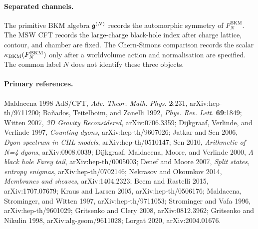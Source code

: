\paragraph{Separated channels.}
The primitive BKM algebra \(\mathfrak{g}^{(N)}\) records the automorphic
symmetry of \(F_N^{\mathrm{BKM}}\). The MSW CFT records the
large-charge black-hole index after charge lattice, contour, and
chamber are fixed. The Chern-Simons comparison records the scalar
\(\kappa_{\mathrm{BKM}}(F_N^{\mathrm{BKM}})\) only after a worldvolume action and
normalisation are specified. The common label \(N\) does not identify
these three objects.

\paragraph{Primary references.}
Maldacena 1998 AdS/CFT, \emph{Adv. Theor. Math. Phys.} \textbf{2}:231,
arXiv:hep-th/9711200;
Ba\~nados, Teitelboim, and Zanelli 1992, \emph{Phys. Rev. Lett.}
\textbf{69}:1849;
Witten 2007, \emph{3D Gravity Reconsidered}, arXiv:0706.3359;
Dijkgraaf, Verlinde, and Verlinde 1997, \emph{Counting dyons},
arXiv:hep-th/9607026;
Jatkar and Sen 2006, \emph{Dyon spectrum in CHL models},
arXiv:hep-th/0510147;
Sen 2010, \emph{Arithmetic of N=4 dyons}, arXiv:0908.0039;
Dijkgraaf, Maldacena, Moore, and Verlinde 2000,
\emph{A black hole Farey tail}, arXiv:hep-th/0005003;
Denef and Moore 2007, \emph{Split states, entropy enigmas},
arXiv:hep-th/0702146;
Nekrasov and Okounkov 2014, \emph{Membranes and sheaves},
arXiv:1404.2323;
Beem and Rastelli 2015, arXiv:1707.07679;
Kraus and Larsen 2005, arXiv:hep-th/0506176;
Maldacena, Strominger, and Witten 1997, arXiv:hep-th/9711053;
Strominger and Vafa 1996, arXiv:hep-th/9601029;
Gritsenko and Clery 2008, arXiv:0812.3962;
Gritsenko and Nikulin 1998, arXiv:alg-geom/9611028;
Lorgat 2020, arXiv:2004.01676.
